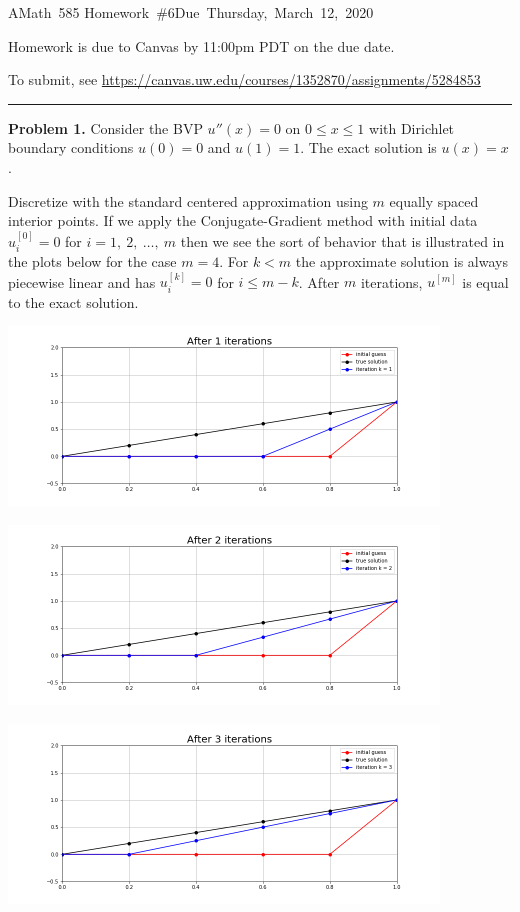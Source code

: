 \documentclass[10pt]{article}
\begin{document}
\hfill\vbox{\hbox{AMath 585}
\hbox{Homework \#6}\hbox{Due Thursday, March 12, 2020}}

\vskip 5pt

Homework is due to Canvas by 11:00pm PDT on the due date.

To submit, see
\url{https://canvas.uw.edu/courses/1352870/assignments/5284853}



\vskip 1cm
\hrule
{\bf Problem 1.}
Consider the BVP $u''(x) = 0$ on $0\leq x \leq 1$ with Dirichlet boundary
conditions $u(0)=0$ and $u(1)=1$.  The exact solution is $u(x)=x$.

Discretize with the standard centered approximation using $m$ equally spaced
interior points.  If we apply the Conjugate-Gradient method with initial
data $u_i^{[0]} = 0$ for $i=1,~2,~\ldots,~m$ then we see the sort of behavior
that is illustrated in the plots below for the case $m=4$.  For $k<m$ 
the approximate 
solution is always piecewise linear and has $u_i^{[k]} = 0$ for $i \leq m-k$.
After $m$ iterations, $u^{[m]}$ is equal to the exact solution.

\hfil\includegraphics[width=4.5in]{frame1.png}\hfil

\hfil\includegraphics[width=4.5in]{frame2.png}\hfil

\hfil\includegraphics[width=4.5in]{frame3.png}\hfil
\end{document}
